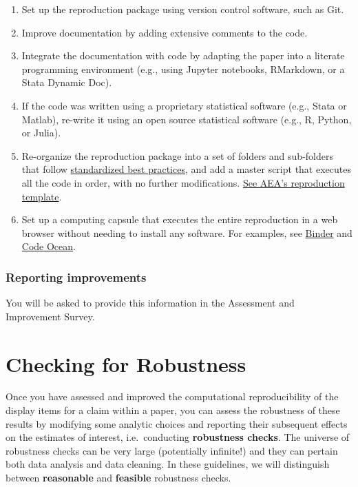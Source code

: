 \documentclass[]{book}
\providecommand{\tightlist}{%
  \setlength{\itemsep}{0pt}\setlength{\parskip}{0pt}}
\begin{document}
\begin{enumerate}
\def\labelenumi{\arabic{enumi}.}
\tightlist
\item
  Set up the reproduction package using version control software, such as Git.
\item
  Improve documentation by adding extensive comments to the code.
\item
  Integrate the documentation with code by adapting the paper into a literate programming environment (e.g., using Jupyter notebooks, RMarkdown, or a Stata Dynamic Doc).
\item
  If the code was written using a proprietary statistical software (e.g., Stata or Matlab), re-write it using an open source statistical software (e.g., R, Python, or Julia).
\item
  Re-organize the reproduction package into a set of folders and sub-folders that follow \href{https://www.projecttier.org/tier-protocol/specifications/\#overview-of-the-documentation}{standardized best practices}, and add a master script that executes all the code in order, with no further modifications. \href{https://github.com/AEADataEditor/replication-template}{See AEA's reproduction template}.\\
\item
  Set up a computing capsule that executes the entire reproduction in a web browser without needing to install any software. For examples, see \href{https://mybinder.org/}{Binder} and \href{https://codeocean.com/}{Code Ocean}.
\end{enumerate}

\hypertarget{reporting-improvements}{%
\subsection{Reporting improvements}\label{reporting-improvements}}

You will be asked to provide this information in the Assessment and Improvement Survey.

\hypertarget{robust}{%
\chapter{Checking for Robustness}\label{robust}}

Once you have assessed and improved the computational reproducibility of the display items for a claim within a paper, you can assess the robustness of these results by modifying some analytic choices and reporting their subsequent effects on the estimates of interest, i.e.~conducting \textbf{robustness checks}. The universe of robustness checks can be very large (potentially infinite!) and they can pertain both data analysis and data cleaning. In these guidelines, we will distinguish between \textbf{reasonable} and \textbf{feasible} robustness checks.
\end{document}
